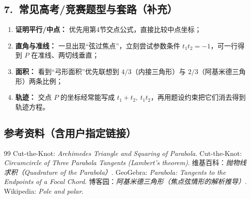 \documentclass[UTF8]{ctexart}
\begin{document}
	\subsection*{7.\ 常见高考/竞赛题型与套路（补充）}
	\begin{enumerate}
		\item \textbf{证明平行/中点：} 优先用第4节交点公式，直接比较中点坐标；
		\item \textbf{直角与准线：} 一旦出现“弦过焦点”，立刻尝试参数条件 $t_1t_2=-1$，可一行得到 $P$ 在准线、两切线垂直；
		\item \textbf{面积：} 看到“弓形面积”优先联想到 $4/3$（内接三角形）与 $2/3$（阿基米德三角形）两条比例；
		\item \textbf{轨迹：} 交点 $P$ 的坐标经常能写成 $t_1+t_2,\ t_1t_2$，再用题设约束把它们消去得到轨迹方程。
	\end{enumerate}
	
	\subsection*{参考资料（含用户指定链接）}
	\begin{thebibliography}{99}
		 Cut-the-Knot: \textit{Archimedes Triangle and Squaring of Parabola}.
		 Cut-the-Knot: \textit{Circumcircle of Three Parabola Tangents (Lambert's theorem)}.
		 维基百科：\textit{抛物线求积（Quadrature of the Parabola）}.
		 GeoGebra: \textit{Parabola: Tangents to the Endpoints of a Focal Chord}.
		 博客园：\textit{阿基米德三角形（焦点弦情形的解析推导）}.
		 Wikipedia: \textit{Pole and polar}.
	\end{thebibliography}
	
	
\end{document}

